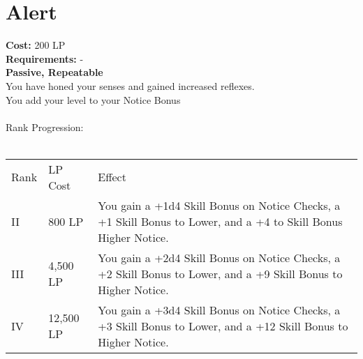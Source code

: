 \section{Alert}\label{perk:alert}
\textbf{Cost:} 200 LP\\
\textbf{Requirements:} -\\
\textbf{Passive, Repeatable}\\
You have honed your senses and gained increased reflexes.\\
You add your level to your Notice Bonus\\
\\
Rank Progression:\\
\\
\begin{longtable}{l | l | p{9cm}}
	Rank & LP Cost  & Effect\\
	II & 800 LP & You gain a +1d4 Skill Bonus on Notice Checks, a +1 Skill Bonus to Lower, and a +4 to Skill Bonus Higher Notice.\\
	III & 4,500 LP & You gain a +2d4 Skill Bonus on Notice Checks, a +2 Skill Bonus to Lower, and a +9 Skill Bonus to Higher Notice.\\
	IV & 12,500 LP & You gain a +3d4 Skill Bonus on Notice Checks, a +3 Skill Bonus to Lower, and a +12 Skill Bonus to Higher Notice.\\
\end{longtable}
